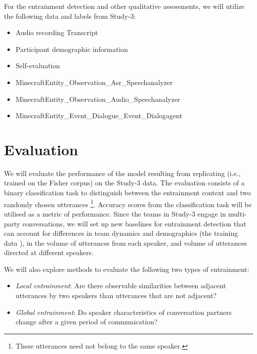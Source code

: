     For the entrainment detection and other qualitative assessments, we will
    utilize the following data and labels from Study-3:

            \begin{itemize}
                   \item Audio recording
                    Transcript
                   \item Participant demographic information
                   \item Self-evaluation
                   \item MinecraftEntity\_Observation\_Asr\_Speechanalyzer
                   \item MinecraftEntity\_Observation\_Audio\_Speechanalyzer
                   \item MinecraftEntity\_Event\_Dialogue\_Event\_Dialogagent
            \end{itemize}

\section{Evaluation}

We will evaluate the performance of the model resulting from replicating
\citet{nasir2020} (i.e., trained on the Fisher corpus\cite{cieri2004fisher}) on
the Study-3 data. The evaluation consists of a binary classification task to
distinguish between the entrainment context and two randomly chosen utterances
\footnote{These utterances need not belong to the same speaker.}. Accuracy
scores from the classification task will be utilised as a metric of
performance. Since the teams in Study-3 engage in multi-party conversations, we
will set up new baselines for entrainment detection that can account for
differences in team dynamics and demographics (the training data ), in the
volume of utterances from each speaker, and volume of utterances directed at
different speakers.

We will also explore methods to evaluate the following two types of
entrainment:

\begin{itemize}

    \item \emph{Local entrainment}: Are there observable similarities between
        adjacent utterances by two speakers than utterances that are not
        adjacent?

    \item \emph{Global entrainment}: Do speaker characteristics of conversation
        partners change after a given period of communication?

\end{itemize}

